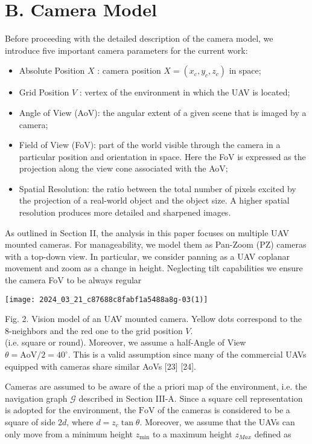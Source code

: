 \documentclass[conference]{IEEEtran}
\begin{document}
\section*{B. Camera Model}
Before proceeding with the detailed description of the camera model, we introduce five important camera parameters for the current work:

\begin{itemize}
  \item Absolute Position $X$ : camera position $X=\left(x_{c}, y_{c}, z_{c}\right)$ in space;
  \item Grid Position $V$ : vertex of the environment in which the UAV is located;
  \item Angle of View (AoV): the angular extent of a given scene that is imaged by a camera;
  \item Field of View (FoV): part of the world visible through the camera in a particular position and orientation in space. Here the FoV is expressed as the projection along the view cone associated with the AoV;
  \item Spatial Resolution: the ratio between the total number of pixels excited by the projection of a real-world object and the object size. A higher spatial resolution produces more detailed and sharpened images.
\end{itemize}

As outlined in Section II, the analysis in this paper focuses on multiple UAV mounted cameras. For manageability, we model them as Pan-Zoom (PZ) cameras with a top-down view. In particular, we consider panning as a UAV coplanar movement and zoom as a change in height. Neglecting tilt capabilities we ensure the camera FoV to be always regular

\begin{center}
\texttt{[image: 2024\_03\_21\_c87688c8fabf1a5488a8g-03(1)]}
\end{center}

Fig. 2. Vision model of an UAV mounted camera. Yellow dots correspond to the 8-neighbors and the red one to the grid position $V$.\\
(i.e. square or round). Moreover, we assume a half-Angle of View $\theta=\mathrm{AoV} / 2=40^{\circ}$. This is a valid assumption since many of the commercial UAVs equipped with cameras share similar AoVs [23] [24].

Cameras are assumed to be aware of the a priori map of the environment, i.e. the navigation graph $\mathcal{G}$ described in Section III-A. Since a square cell representation is adopted for the environment, the $\mathrm{FoV}$ of the cameras is considered to be a square of side $2 d$, where $d=z_{c} \tan \theta$. Moreover, we assume that the UAVs can only move from a minimum height $z_{\min }$ to a maximum height $z_{M a x}$ defined as
\end{document}
